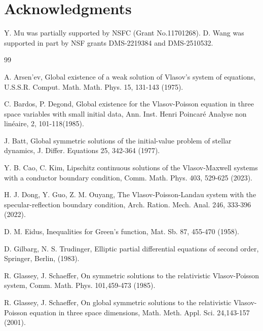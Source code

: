 \documentclass[11pt,reqno]{amsart}%
\theoremstyle{definition}
\theoremstyle{remark}
\begin{document}
\section*{Acknowledgments}
Y. Mu was partially supported  by NSFC (Grant No.11701268).
D. Wang was supported in part by NSF grants DMS-2219384 and DMS-2510532.
 
 \medskip
\begin{thebibliography}{99}

 A. Arsen'ev, Global existence of a weak solution of Vlasov's system of equations, U.S.S.R. Comput.
Math. Math. Phys. 15, 131-143 (1975).

C. Bardos, P.  Degond, Global existence for the Vlasov-Poisson equation in
three space variables with small initial data, Ann. Inst. Henri Poincar\'{e} Analyse
non lin\'{e}aire, 2, 101-118(1985).

J. Batt, Global symmetric solutions of the initial-value problem of stellar dynamics, J. Differ.
Equations 25, 342-364 (1977).

Y. B. Cao, C. Kim, Lipschitz continuous solutions of the Vlasov-Maxwell
systems with a conductor boundary condition, Comm. Math. Phys. 403, 529-625 (2023).

H. J. Dong, Y. Guo, Z. M. Ouyang, The Vlasov-Poisson-Landau system with the
specular-reflection boundary condition, Arch. Ration. Mech. Anal. 246, 333-396 (2022).


 D. M. Eidus, Inequalities for Green's function, Mat. Sb. 87, 455-470 (1958).

D. Gilbarg, N. S. Trudinger, Elliptic partial differential equations of second order,
Springer, Berlin, (1983).


R. Glassey, J. Schaeffer, On symmetric solutions to the relativistic Vlasov-Poisson system, Comm. Math. Phys. 101,459-473 (1985).

R. Glassey, J. Schaeffer, On global symmetric solutions to the relativistic
Vlasov-Poisson equation in three space dimensions, Math. Meth. Appl. Sci. 24,143-157 (2001).


\end{thebibliography}
\end{document}
